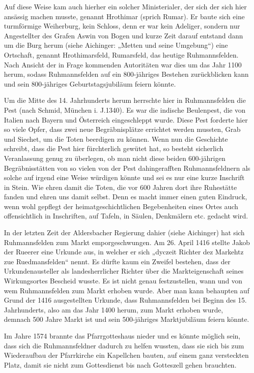 \documentclass[12pt,a4paper]{book}
\begin{document}
Auf diese Weise kam auch hierher ein solcher Ministerialer, der sich der sich
hier ansässig machen musste, genannt Hrothimar (sprich Rumar). Er baute sich
eine turmförmige Weiherburg, kein Schloss, denn er war kein Adeliger, sondern
nur Angestellter des Grafen Aswin von Bogen und kurze Zeit darauf entstand dann
um die Burg herum (siehe Aichinger: „Metten und seine Umgebung“) eine Ortschaft,
genannt Hrothimarsfeld, Rumarsfeld, das heutige Ruhmannsfelden. Nach Ansicht der
in Frage kommenden Autoritäten war dies um das Jahr 1100 herum, sodass
Ruhmannsfelden auf ein 800-jähriges Bestehen zurückblicken kann und sein
800-jähriges Geburtstagsjubiläum feiern könnte.

Um die Mitte des 14. Jahrhunderts herum herrschte hier in Ruhmannsfelden die
Pest (nach Schmid, München i. J.1340). Es war die indische Beulenpest, die von
Italien nach Bayern und Österreich eingeschleppt wurde. Diese Pest forderte hier
so viele Opfer, dass zwei neue Begräbnisplätze errichtet werden mussten, Grab
und Siechet, um die Toten beerdigen zu können. Wenn nun die Geschichte schreibt,
dass die Pest hier fürchterlich gewütet hat, so besteht sicherlich Veranlassung
genug zu überlegen, ob man nicht diese beiden 600-jährigen Begräbnisstätten von
so vielen von der Pest dahingerafften Ruhmannsfeldnern als solche auf irgend
eine Weise würdigen könnte und sei es nur eine kurze Inschrift in Stein. Wie
ehren damit die Toten, die vor 600 Jahren dort ihre Ruhestätte fanden und ehren
uns damit selbst. Denn es macht immer einen guten Eindruck, wenn wohl gepflegt
der heimatgeschichtlichen Begebenheiten eines Ortes auch offensichtlich in
Inschriften, auf Tafeln, in Säulen, Denkmälern etc. gedacht wird.

In der letzten Zeit der Aldersbacher Regierung dahier (siehe Aichinger) hat sich
Ruhmannsfelden zum Markt emporgeschwungen. Am 26. April 1416 stellte Jakob der
Rueerer eine Urkunde aus, in welcher er sich „dyczeit Richter dez Markehtz zue
Ruedmansfelden“ nennt. Es dürfte kaum ein Zweifel bestehen, dass der
Urkundenausteller als landesherrlicher Richter über die Markteigenschaft seines
Wirkungsortes Bescheid wusste. Es ist nicht genau festzustellen, wann und von
wem Ruhmannsfelden zum Markt erhoben wurde. Aber man kann behaupten auf Grund
der 1416 ausgestellten Urkunde, dass Ruhmannsfelden bei Beginn des 15.
Jahrhunderts, also am das Jahr 1400 herum, zum Markt erhoben wurde, demnach 500
Jahre Markt ist und sein 500-jähriges Marktjubiläum feiern könnte.

Im Jahre 1574 brannte das Pfarrgotteshaus nieder und es könnte möglich sein,
dass sich die Ruhmannsfeldner dadurch zu helfen wussten, dass sie sich bis zum
Wiederaufbau der Pfarrkirche ein Kapellchen bauten, auf einem ganz versteckten
Platz, damit sie nicht zum Gottesdienst bis nach Gotteszell gehen brauchten.
\end{document}
